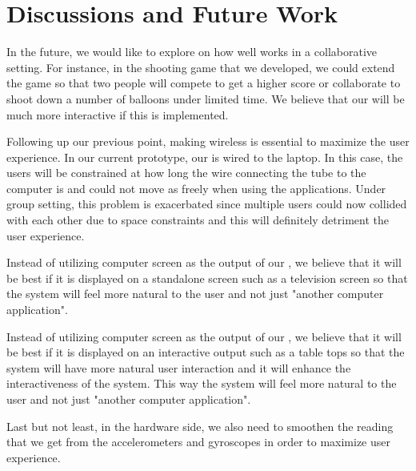 \section{Discussions and Future Work}\label{sec:fut-work}
In the future, we would like to explore on how well \tube works in a collaborative setting. For instance, in the shooting game that we developed, we could extend the game so that two people will compete to get a higher score or collaborate to shoot down a number of balloons under limited time. We believe that our \tube will be much more interactive if this is implemented.

Following up our previous point, making \tube wireless is essential to maximize the user experience. In our current prototype, our \tube is wired to the laptop. In this case, the users will be constrained at how long the wire connecting the tube to the computer is and could not move as freely when using the applications. Under group setting, this problem is exacerbated since multiple users could now collided with each other due to space constraints and this will definitely detriment the user experience.

Instead of utilizing computer screen as the output of our \tube, we believe that it will be best if it is displayed on a standalone screen such as a television screen so that the \tube system will feel more natural to the user and not just "another computer application".

Instead of utilizing computer screen as the output of our \tube, we believe that it will be best if it is displayed on an interactive output such as a table tops so that the \tube system will have more natural user interaction and it will enhance the interactiveness of the system. This way the \tube system will feel more natural to the user and not just "another computer application".

Last but not least, in the hardware side, we also need to smoothen the reading that we get from the accelerometers and gyroscopes in order to maximize user experience.


